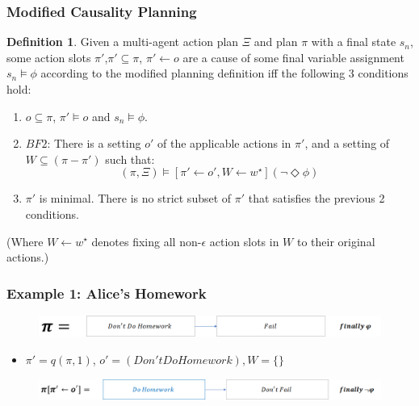 \documentclass{beamer}
\theoremstyle{plain}
\theoremstyle{definition}
\newtheorem{defn}[thm]{Definition} %
\begin{document}
\begin{frame}
\frametitle{Modified Causality Planning}
\begin{defn}
Given a multi-agent action plan $\Xi$ and plan $\pi$ with a final state $s_n$, some action slots $\pi'$,$\pi' \subseteq \pi$, $\pi' \leftarrow o$ are a cause of some final variable assignment $s_n \models \phi$ according to the modified planning definition iff the following 3 conditions hold:
\begin{enumerate}
\item  $o \subseteq \pi$, $\pi' \models o$ and $s_n \models \phi$.
\item $BF2$: There is a setting $o'$ of the applicable actions in $\pi'$, and a setting of $W \subseteq (\pi  - \pi')$ such that:
\[
(\pi, \Xi) \models [\pi' \leftarrow o', W \leftarrow w^\star](\lnot \Diamond \phi)
\]
\item $\pi'$ is minimal. There is no strict subset of $\pi'$ that satisfies the previous 2 conditions.
\end{enumerate}


(Where $W\leftarrow w^\star$ denotes fixing all non-$\epsilon$ action slots in $W$ to their original actions.)

\end{defn}

\end{frame}

\begin{frame}
\frametitle{Example 1: Alice's Homework}
\begin{figure}
\includegraphics[scale=.35]{alicePlan}
\end{figure}

\begin{itemize}
\item $\pi'= q(\pi,1)$, $o'=(Don't Do Homework), W=\{\}$
\end{itemize}

\begin{figure}
\includegraphics[scale=.35]{alicePlanCounterfactual}
\end{figure}
\end{frame}
\end{document}
